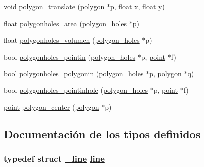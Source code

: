 \begin{CompactItemize}
\item 
void \hyperlink{group__geometry_g7538c2bf0d1e8acc0cfc055b6bf3a96b_g7538c2bf0d1e8acc0cfc055b6bf3a96b}{polygon\_\-translate} (\hyperlink{struct__polygon}{polygon} $\ast$p, float x, float y)
\item 
float \hyperlink{group__geometry_g380cdcfa6caf51828c8d06f4518a4084_g380cdcfa6caf51828c8d06f4518a4084}{polygonholes\_\-area} (\hyperlink{struct__polygon__holes}{polygon\_\-holes} $\ast$p)
\item 
float \hyperlink{group__geometry_g7cf8b3f8c76179bb936754bbbf510999_g7cf8b3f8c76179bb936754bbbf510999}{polygonholes\_\-volumen} (\hyperlink{struct__polygon__holes}{polygon\_\-holes} $\ast$p)
\item 
bool \hyperlink{group__geometry_g35a6dd45f6d0cbed26ef8a69ed34a2e9_g35a6dd45f6d0cbed26ef8a69ed34a2e9}{polygonholes\_\-pointin} (\hyperlink{struct__polygon__holes}{polygon\_\-holes} $\ast$p, \hyperlink{struct__point}{point} $\ast$f)
\item 
bool \hyperlink{group__geometry_g496bae87588cb5710ced80f713da98ad_g496bae87588cb5710ced80f713da98ad}{polygonholes\_\-polygonin} (\hyperlink{struct__polygon__holes}{polygon\_\-holes} $\ast$p, \hyperlink{struct__polygon}{polygon} $\ast$q)
\item 
bool \hyperlink{group__geometry_g139317720b027c782db9424256ba2c2d_g139317720b027c782db9424256ba2c2d}{polygonholes\_\-pointinhole} (\hyperlink{struct__polygon__holes}{polygon\_\-holes} $\ast$p, \hyperlink{struct__point}{point} $\ast$f)
\item 
\hyperlink{struct__point}{point} \hyperlink{group__geometry_ge39fef354e4411678ec081c197b29825_ge39fef354e4411678ec081c197b29825}{polygon\_\-center} (\hyperlink{struct__polygon}{polygon} $\ast$p)
\end{CompactItemize}


\subsection{Documentaci\'{o}n de los tipos definidos}
\hypertarget{group__geometry_gbb4d6a1464226fe9b7c0d80348e5eb98_gbb4d6a1464226fe9b7c0d80348e5eb98}{
\subsubsection[line]{\setlength{\rightskip}{0pt plus 5cm}typedef struct \hyperlink{struct__line}{\_\-line} \hyperlink{struct__line}{line}}}
\label{group__geometry_gbb4d6a1464226fe9b7c0d80348e5eb98_gbb4d6a1464226fe9b7c0d80348e5eb98}




